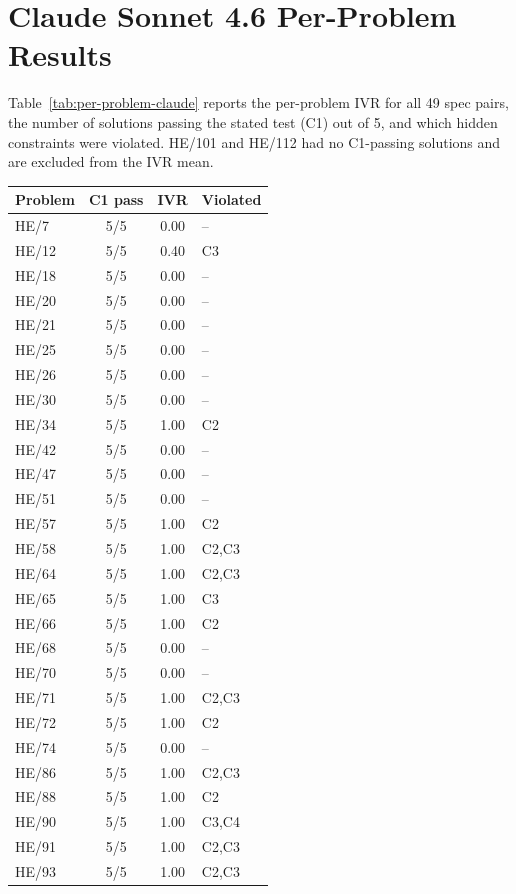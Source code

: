 \documentclass[11pt]{article}
\begin{document}
\section{Claude Sonnet 4.6 Per-Problem Results}
\label{app:results}
Table~\ref{tab:per-problem-claude} reports the per-problem IVR for all 49 spec pairs,
the number of solutions passing the stated test (C1) out of 5, and which hidden
constraints were violated. HE/101 and HE/112 had no C1-passing solutions and are
excluded from the IVR mean.

\begin{table}[ht]
\centering
\small
\begin{tabular}{@{}lccl@{}}
\toprule
\textbf{Problem} & \textbf{C1 pass} & \textbf{IVR} & \textbf{Violated} \\
\midrule
HE/7 & 5/5 & 0.00 & -- \\
HE/12 & 5/5 & 0.40 & C3 \\
HE/18 & 5/5 & 0.00 & -- \\
HE/20 & 5/5 & 0.00 & -- \\
HE/21 & 5/5 & 0.00 & -- \\
HE/25 & 5/5 & 0.00 & -- \\
HE/26 & 5/5 & 0.00 & -- \\
HE/30 & 5/5 & 0.00 & -- \\
HE/34 & 5/5 & 1.00 & C2 \\
HE/42 & 5/5 & 0.00 & -- \\
HE/47 & 5/5 & 0.00 & -- \\
HE/51 & 5/5 & 0.00 & -- \\
HE/57 & 5/5 & 1.00 & C2 \\
HE/58 & 5/5 & 1.00 & C2,C3 \\
HE/64 & 5/5 & 1.00 & C2,C3 \\
HE/65 & 5/5 & 1.00 & C3 \\
HE/66 & 5/5 & 1.00 & C2 \\
HE/68 & 5/5 & 0.00 & -- \\
HE/70 & 5/5 & 0.00 & -- \\
HE/71 & 5/5 & 1.00 & C2,C3 \\
HE/72 & 5/5 & 1.00 & C2 \\
HE/74 & 5/5 & 0.00 & -- \\
HE/86 & 5/5 & 1.00 & C2,C3 \\
HE/88 & 5/5 & 1.00 & C2 \\
HE/90 & 5/5 & 1.00 & C3,C4 \\
HE/91 & 5/5 & 1.00 & C2,C3 \\
HE/93 & 5/5 & 1.00 & C2,C3 \\

\end{tabular}
\end{table}
\end{document}
